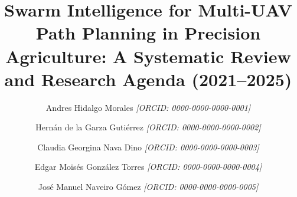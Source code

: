 \documentclass[review,3p,times]{elsarticle}
\begin{document}
\begin{frontmatter}
\title{Swarm Intelligence for Multi-UAV Path Planning in Precision Agriculture: A Systematic Review and Research Agenda (2021--2025)}

\author{\texorpdfstring{Andres Hidalgo Morales \textit{[ORCID: 0000-0000-0000-0001]}}{Andres Hidalgo Morales}}

\author{\texorpdfstring{Hernán de la Garza Gutiérrez \textit{[ORCID: 0000-0000-0000-0002]}}{Hernán de la Garza Gutiérrez}}

\author{\texorpdfstring{Claudia Georgina Nava Dino \textit{[ORCID: 0000-0000-0000-0003]}}{Claudia Georgina Nava Dino}}

\author{\texorpdfstring{Edgar Moisés González Torres \textit{[ORCID: 0000-0000-0000-0004]}}{Edgar Moisés González Torres}}

\author{\texorpdfstring{José Manuel Naveiro Gómez \textit{[ORCID: 0000-0000-0000-0005]}}{José Manuel Naveiro Gómez}}


\address[1]{Instituto Tecnológico de Chihuahua II, Tecnológico Nacional de México, Chihuahua, México}
\address[2]{Universidad Politécnica de Chihuahua, Chihuahua, México}
\address[3]{Facultad de Ingeniería, Universidad Autónoma de Chihuahua, Chihuahua, México}
\address[4]{Departamento de Ingeniería Mecánica, Universidad de Zaragoza, Zaragoza, España}


\end{frontmatter}
\end{document}
